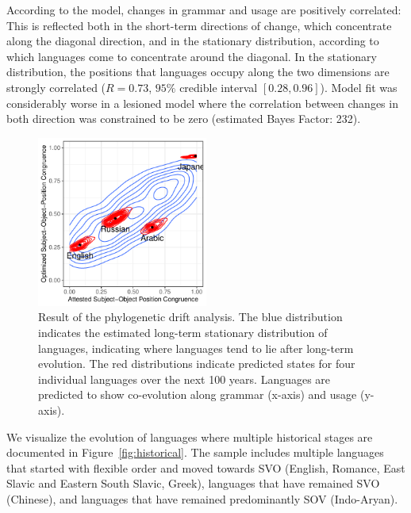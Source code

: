 \documentclass[11pt,a4paper]{article}
\begin{document}
According to the model, changes in grammar and usage are positively correlated:
This is reflected both in the short-term directions of change, which concentrate along the diagonal direction, and in the stationary distribution, according to which languages come to concentrate around the diagonal.
In the stationary distribution, the positions that languages occupy along the two dimensions are strongly correlated ($R=0.73$, $95\%$ credible interval $[0.28, 0.96]$).
Model fit was considerably worse in a lesioned model where the correlation between changes in both direction was constrained to be zero (estimated Bayes Factor: 232).


\begin{figure}
    \centering
    \includegraphics[width=0.5\textwidth]{../change/visualize/stationary.pdf}
    \caption{Result of the phylogenetic drift analysis.
    The blue distribution indicates the estimated long-term stationary distribution of languages, indicating where languages tend to lie after long-term evolution.
    The red distributions indicate predicted states for four individual languages over the next 100 years. Languages are predicted to show co-evolution along grammar (x-axis)  and usage (y-axis).}
    \label{fig:drift-model}
\end{figure}



We visualize the evolution of languages where multiple historical stages are documented in Figure~\ref{fig:historical}.
The sample includes multiple languages that started with flexible order and moved towards SVO (English, Romance, East Slavic and Eastern South Slavic, Greek), languages that have remained SVO (Chinese), and languages that have remained predominantly SOV (Indo-Aryan).
\end{document}
